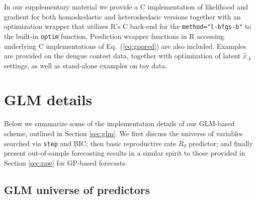 \documentclass[12pt]{article}
\begin{document}
In our supplementary material we provide a {\sf C} implementation of
likelihood and gradient for both homoskedastic and heteroskedasic versions
together with an optimization wrapper that utilizes {\sf R}'s {\sf C} back-end
for the \verb!method="l-bfgs-b"! to the built-in {\tt optim} function.
Prediction wrapper functions in {\sf R} accessing underlying {\sf C}
implementations of Eq.~(\ref{eq:gppred}) are also included. Examples are
provided on the dengue contest data, together with optimization of latent
$\hat{x}_{\cdot 4}$ settings, as well as stand-alone examples on toy data.

\section{GLM details}
\label{sec:apglm}

Below we summarize some of the implementation details of our GLM-based scheme,
outlined in Section \ref{sec:glm}.  We first discuss the universe of variables
searched via {\tt step} and BIC; then basic reproductive
rate $R_0$ predictor; and finally present out-of-sample forecasting results in
a similar spirit to those provided in Section \ref{sec:raw} for GP-based
forecasts.

\subsection{GLM universe of predictors}
\label{sec:glmuniv}
\end{document}
